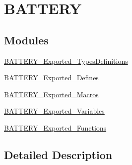 \hypertarget{group___b_a_t_t_e_r_y}{}\section{B\+A\+T\+T\+E\+RY}
\label{group___b_a_t_t_e_r_y}
\subsection*{Modules}
\begin{DoxyCompactItemize}
\item 
\mbox{\hyperlink{group___b_a_t_t_e_r_y___exported___types_definitions}{B\+A\+T\+T\+E\+R\+Y\+\_\+\+Exported\+\_\+\+Types\+Definitions}}
\item 
\mbox{\hyperlink{group___b_a_t_t_e_r_y___exported___defines}{B\+A\+T\+T\+E\+R\+Y\+\_\+\+Exported\+\_\+\+Defines}}
\item 
\mbox{\hyperlink{group___b_a_t_t_e_r_y___exported___macros}{B\+A\+T\+T\+E\+R\+Y\+\_\+\+Exported\+\_\+\+Macros}}
\item 
\mbox{\hyperlink{group___b_a_t_t_e_r_y___exported___variables}{B\+A\+T\+T\+E\+R\+Y\+\_\+\+Exported\+\_\+\+Variables}}
\item 
\mbox{\hyperlink{group___b_a_t_t_e_r_y___exported___functions}{B\+A\+T\+T\+E\+R\+Y\+\_\+\+Exported\+\_\+\+Functions}}
\end{DoxyCompactItemize}


\subsection{Detailed Description}
